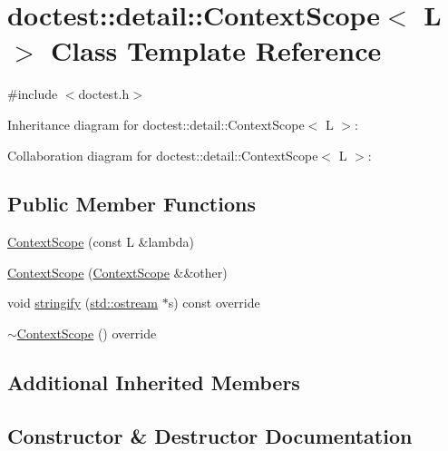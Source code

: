 \hypertarget{classdoctest_1_1detail_1_1_context_scope}{}\section{doctest\+:\+:detail\+:\+:Context\+Scope$<$ L $>$ Class Template Reference}
\label{classdoctest_1_1detail_1_1_context_scope}


{\ttfamily \#include $<$doctest.\+h$>$}



Inheritance diagram for doctest\+:\+:detail\+:\+:Context\+Scope$<$ L $>$\+:


Collaboration diagram for doctest\+:\+:detail\+:\+:Context\+Scope$<$ L $>$\+:
\subsection*{Public Member Functions}
\begin{DoxyCompactItemize}
\item 
\hyperlink{classdoctest_1_1detail_1_1_context_scope_a344c76a0374615d567a084c0a0ffd215}{Context\+Scope} (const L \&lambda)
\item 
\hyperlink{classdoctest_1_1detail_1_1_context_scope_afca3228fdeb0e86257a21f826c4247ff}{Context\+Scope} (\hyperlink{classdoctest_1_1detail_1_1_context_scope}{Context\+Scope} \&\&other)
\item 
void \hyperlink{classdoctest_1_1detail_1_1_context_scope_a4636ac32ae41ae108c7ada4a164ffaeb}{stringify} (\hyperlink{doctest_8h_a116af65cb5e924b33ad9d9ecd7a783f3}{std\+::ostream} $\ast$s) const override
\item 
\hyperlink{classdoctest_1_1detail_1_1_context_scope_a1ee7d4702398ee8d0e80ab843aa260d7}{$\sim$\+Context\+Scope} () override
\end{DoxyCompactItemize}
\subsection*{Additional Inherited Members}


\subsection{Constructor \& Destructor Documentation}
\mbox{\label{classdoctest_1_1detail_1_1_context_scope_a344c76a0374615d567a084c0a0ffd215}} 
